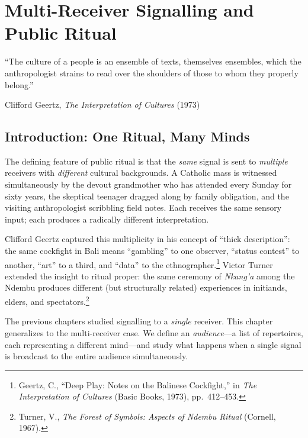 \chapter{Multi-Receiver Signalling and Public Ritual}
\label{ch:multireceiver}

\epigraph{%
  ``The culture of a people is an ensemble of texts, themselves ensembles,
  which the anthropologist strains to read over the shoulders of those to
  whom they properly belong.''}%
  {Clifford Geertz, \textit{The Interpretation of Cultures} (1973)}

\section{Introduction: One Ritual, Many Minds}
\label{sec:mr-intro}

The defining feature of public ritual is that the \emph{same} signal is
sent to \emph{multiple} receivers with \emph{different} cultural
backgrounds.  A Catholic mass is witnessed simultaneously by the devout
grandmother who has attended every Sunday for sixty years, the skeptical
teenager dragged along by family obligation, and the visiting anthropologist
scribbling field notes.  Each receives the same sensory input; each produces
a radically different interpretation.

Clifford Geertz captured this multiplicity in his concept of ``thick
description'': the same cockfight in Bali means ``gambling'' to one
observer, ``status contest'' to another, ``art'' to a third, and ``data''
to the ethnographer.\footnote{Geertz, C., ``Deep Play: Notes on the
Balinese Cockfight,'' in \textit{The Interpretation of Cultures} (Basic
Books, 1973), pp.~412--453.}  Victor Turner extended the insight to ritual
proper: the same ceremony of \emph{Nkang'a} among the Ndembu produces
different (but structurally related) experiences in initiands, elders, and
spectators.\footnote{Turner, V., \textit{The Forest of Symbols: Aspects of
Ndembu Ritual} (Cornell, 1967).}

The previous chapters studied signalling to a \emph{single} receiver.  This
chapter generalizes to the multi-receiver case.  We define an
\emph{audience}---a list of repertoires, each representing a different
mind---and study what happens when a single signal is broadcast to the
entire audience simultaneously.


